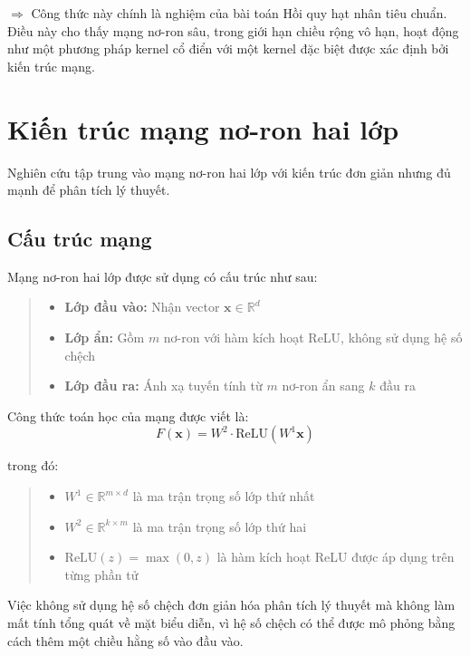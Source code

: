 $\Rightarrow$ Công thức này chính là nghiệm của bài toán Hồi quy hạt nhân tiêu chuẩn. Điều này cho thấy mạng nơ-ron sâu, trong giới hạn chiều rộng vô hạn, hoạt động như một phương pháp kernel cổ điển với một kernel đặc biệt được xác định bởi kiến trúc mạng.

\section{Kiến trúc mạng nơ-ron hai lớp}

Nghiên cứu tập trung vào mạng nơ-ron hai lớp với kiến trúc đơn giản nhưng đủ mạnh để phân tích lý thuyết.

\subsection{Cấu trúc mạng}

Mạng nơ-ron hai lớp được sử dụng có cấu trúc như sau:
\begin{quote}
\begin{itemize}
    \item \textbf{Lớp đầu vào:} Nhận vector $\mathbf{x} \in \mathbb{R}^d$
    \item \textbf{Lớp ẩn:} Gồm $m$ nơ-ron với hàm kích hoạt ReLU, không sử dụng hệ số chệch
    \item \textbf{Lớp đầu ra:} Ánh xạ tuyến tính từ $m$ nơ-ron ẩn sang $k$ đầu ra
\end{itemize}
\end{quote}

Công thức toán học của mạng được viết là:
\begin{equation}
    F(\mathbf{x}) = W^2 \cdot \text{ReLU}(W^1 \mathbf{x})
\end{equation}

trong đó:
\begin{quote}
\begin{itemize}
    \item $W^1 \in \mathbb{R}^{m \times d}$ là ma trận trọng số lớp thứ nhất
    \item $W^2 \in \mathbb{R}^{k \times m}$ là ma trận trọng số lớp thứ hai
    \item $\text{ReLU}(z) = \max(0, z)$ là hàm kích hoạt ReLU được áp dụng trên từng phần tử
\end{itemize}
\end{quote}

Việc không sử dụng hệ số chệch đơn giản hóa phân tích lý thuyết mà không làm mất tính tổng quát về mặt biểu diễn, vì hệ số chệch có thể được mô phỏng bằng cách thêm một chiều hằng số vào đầu vào.

